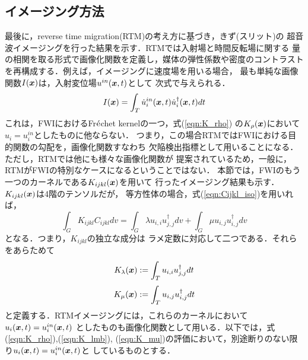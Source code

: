 \subsection{イメージング方法}
最後に，reverse time migration(RTM)の考え方に基づき，きず(スリット)の
超音波イメージングを行った結果を示す．RTMでは入射場と時間反転場に関する
量の相関を取る形式で画像化関数を定義し，媒体の弾性係数や密度のコントラスト
を再構成する．例えば，イメージングに速度場を用いる場合，
最も単純な画像関数$I(\boldsymbol{x})$は，入射変位場$u^{in}(\boldsymbol{x},t)$として
次式で与えられる．
\begin{equation}
	I(\boldsymbol{x})=\int_T \dot u^{in}_i(\boldsymbol{x},t) \dot u_i^{\dagger}(\boldsymbol{x},t)dt
	\label{eqn:Ix}
\end{equation}
これは，FWIにおけるFr$\acute{\rm e}$chet kernelの一つ，式(\ref{eqn:K_rho})
の$K_\rho(\boldsymbol{x})$において$u_i=u_i^{in}$としたものに他ならない．
つまり，この場合RTMではFWIにおける目的関数の勾配を，画像化関数すなわち
欠陥検出指標として用いることになる．ただし，RTMでは他にも様々な画像化関数が
提案されているため，一般に，RTMがFWIの特別なケースになるということではない．
本節では，FWIのもう一つのカーネルである$K_{ijkl}(\boldsymbol{x})$を用いて
行ったイメージング結果も示す．$K_{ijkl}(\boldsymbol{x})$は4階のテンソルだが，
等方性体の場合，式(\ref{eqn:Cijkl_iso})を用いれば，
\begin{equation}
	\int_G K_{ijkl}C_{ijkl}dv
	=
	\int_G \lambda u_{i,i}u^{\dagger}_{j,j} dv
	+
	\int_G \mu u_{i,j}u^{\dagger}_{i,j} dv
	\label{eqn:}
\end{equation}
となる．つまり，$K_{ijkl}$の独立な成分は
ラメ定数に対応して二つである．それらをあらためて
\begin{equation}
	K_\lambda(\boldsymbol{x}):= \int_T u_{i,i}u^{\dagger}_{j,j} dt
	\label{eqn:K_lmb}
\end{equation}
\begin{equation}
	K_\mu(\boldsymbol{x}):= \int_T u_{i,j}u^{\dagger}_{i,j} dt
	\label{eqn:K_mu}
\end{equation}
と定義する．RTMイメージングには，これらのカーネルにおいて$u_i(\boldsymbol{x},t)=u_i^{in}(\boldsymbol{x},t)$
としたものも画像化関数として用いる．以下では，式(\ref{eqn:K_rho}),(\ref{eqn:K_lmb}),
(\ref{eqn:K_mu})の評価において，別途断りのない限り$u_i(\boldsymbol{x},t)=u_i^{in}(\boldsymbol{x},t)$と
しているものとする．
